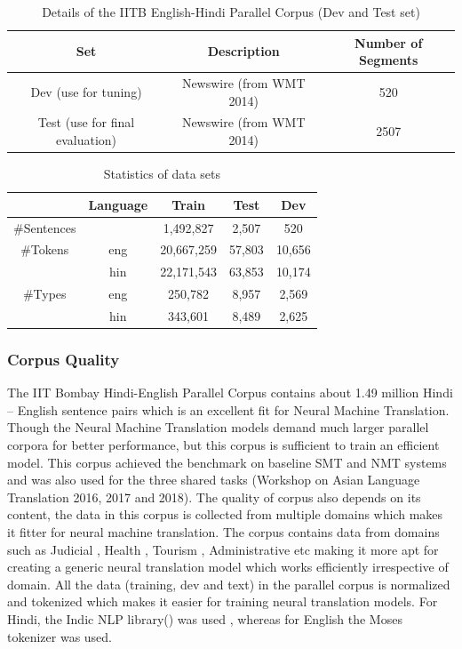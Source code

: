 \begin{table}[h!]
\centering
 \begin{tabular}{ |ccc| } 
  \hline \textbf{Set} & \textbf{Description} & \textbf{Number of Segments}  \\ 
  \hline
  Dev (use for tuning)& Newswire (from WMT 2014)&520\\
  Test (use for final evaluation)& Newswire (from WMT 2014) &2507\\
  \hline
 \end{tabular}
\caption{Details of the IITB English-Hindi Parallel Corpus (Dev and Test set)}
\end{table}

\begin{table}[h!]
\centering
 \begin{tabular}{ |ccccc| } 
  \hline &\textbf{Language} & \textbf{Train} & \textbf{Test} & \textbf{Dev} \\ 
  \hline 
  \#Sentences && 1,492,827&2,507& 520\\
  \hline
  \#Tokens& eng&20,667,259 &57,803& 10,656\\
  &hin& 22,171,543&63,853&10,174\\
  \hline
  \#Types&eng&250,782&8,957& 2,569\\
  &hin& 343,601&8,489& 2,625\\
  \hline
 \end{tabular}
\caption{Statistics of data sets}
\end{table}

\subsubsection{Corpus Quality}
The IIT Bombay Hindi-English Parallel Corpus contains about 1.49 million Hindi – English sentence pairs which is an excellent fit for Neural Machine Translation. Though the Neural Machine Translation models demand much larger parallel corpora for better performance, but this corpus  is sufficient to train an efficient model. This corpus achieved the benchmark on baseline SMT and NMT systems and was also used for the three shared tasks (Workshop on Asian Language Translation 2016, 2017 and 2018). The quality of corpus also depends on its content, the data in this corpus is collected from multiple domains which makes it fitter for neural machine translation. The corpus contains data from domains such as Judicial , Health , Tourism , Administrative etc making it more apt for creating a generic neural translation model which works efficiently irrespective of domain.
All the data (training, dev and text) in the parallel corpus is normalized and tokenized which makes it easier for training neural translation models. For Hindi, the Indic NLP library(\cite{Kunchukuttan2013}) was used , whereas for English the Moses tokenizer was used.  

